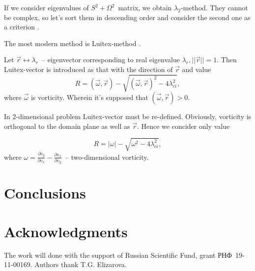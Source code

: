 \documentclass{article}
\begin{document}
If we consider eigenvalues of $S^2+\Omega^2$~matrix, we obtain $\lambda_2$-method. They cannot be complex, so let's sort them in descending order and consider the second one as a criterion \cite{vortex}\cite{Hussain}.

The most modern method is Luitex-method \cite{vortex}.

Let $\vec r \longleftrightarrow \lambda_r$~-- eigenvector corresponding to real eigenvalue $\lambda_r, ||\vec r||=1$. Then Luitex-vector is introduced as that with the direction of $\vec r$ and value
 $$R=(\vec \omega,\vec r)-\sqrt{(\vec \omega,\vec r)^2-4\lambda_{ci}^2},$$\noindent where $\vec \omega$ is vorticity. Wherein it's supposed that $(\vec \omega,\vec r)>0$.
 
 In 2-dimensional problem Luitex-vector must be re-defined. Obviously, vorticity is orthogonal to the domain plane as well as $\vec r$. Hence we concider only value
 
 $$R=|\omega|- \sqrt{\omega^2-4\lambda_{ci}^2},$$\noindent where $\omega=\frac{\partial v_y}{\partial v_x}-\frac{\partial v_x}{\partial v_y}$~-- two-dimensional vorticity.

\section{Conclusions}



\section{Acknowledgments}



The work will done with the support of Russian Scientific Fund, grant РНФ~19-11-00169.
Authors thank T.G. Elizarova.



\end{document}
